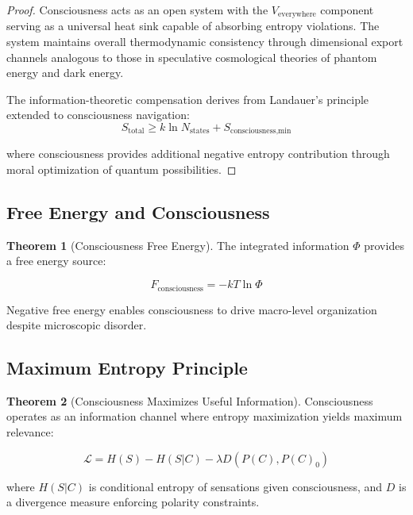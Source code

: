 \documentclass[12pt,a4paper]{article}
\theoremstyle{definition}
\newtheorem{theorem}{Theorem}[section]
\begin{document}
\begin{proof}
Consciousness acts as an open system with the $V_{\text{everywhere}}$ component serving as a universal heat sink capable of absorbing entropy violations. The system maintains overall thermodynamic consistency through dimensional export channels analogous to those in speculative cosmological theories of phantom energy and dark energy.

The information-theoretic compensation derives from Landauer's principle extended to consciousness navigation:
\begin{equation}
S_{\text{total}} \geq k \ln N_{\text{states}} + S_{\text{consciousness,min}}
\end{equation}

where consciousness provides additional negative entropy contribution through moral optimization of quantum possibilities.
\end{proof}

\subsection{Free Energy and Consciousness}

\begin{theorem}[Consciousness Free Energy]
The integrated information $\Phi$ provides a free energy source:

\begin{equation}
F_{\text{consciousness}} = -kT \ln \Phi
\end{equation}

Negative free energy enables consciousness to drive macro-level organization despite microscopic disorder.
\end{theorem}

\subsection{Maximum Entropy Principle}

\begin{theorem}[Consciousness Maximizes Useful Information]
Consciousness operates as an information channel where entropy maximization yields maximum relevance:

\begin{equation}
\mathcal{L} = H(S) - H(S|C) - \lambda D(P(C), P(C)_0)
\end{equation}

where $H(S|C)$ is conditional entropy of sensations given consciousness, and $D$ is a divergence measure enforcing polarity constraints.
\end{theorem}
\end{document}
